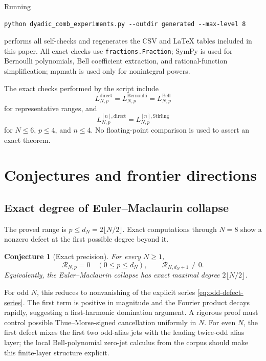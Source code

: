 \documentclass[11pt,oneside]{article}
\numberwithin{equation}{section}
\newtheorem{conjecture}[theorem]{Conjecture}
\theoremstyle{definition}
\theoremstyle{remark}
\newcommand{\defect}{\mathcal R}
\begin{document}
\begin{statusbox}[Reproducibility]
Running
\begin{lstlisting}[style=python]
python dyadic_comb_experiments.py --outdir generated --max-level 8
\end{lstlisting}
performs all self-checks and regenerates the CSV and LaTeX tables included in this paper.
All exact checks use \texttt{fractions.Fraction}; SymPy is used for Bernoulli polynomials,
Bell coefficient extraction, and rational-function simplification; mpmath is used only
for nonintegral powers.
\end{statusbox}

The exact checks performed by the script include
\begin{equation}
 L_{N,p}^{\mathrm{direct}}
 =L_{N,p}^{\mathrm{Bernoulli}}
 =L_{N,p}^{\mathrm{Bell}}
 \label{eq:three-way-check}
\end{equation}
for representative ranges, and
\begin{equation}
 L_{N,p}^{[n],\mathrm{direct}}
 =L_{N,p}^{[n],\mathrm{Stirling}}
 \label{eq:iterated-check}
\end{equation}
for \(N\le6\), \(p\le4\), and \(n\le4\).  No floating-point comparison is used to
assert an exact theorem.

\section{Conjectures and frontier directions}
\label{sec:frontiers}

\subsection{Exact degree of Euler--Maclaurin collapse}

The proved range is \(p\le d_N=2\lfloor N/2\rfloor\).  Exact computations through
\(N=8\) show a nonzero defect at the first possible degree beyond it.

\begin{conjecture}[Exact precision]\label{conj:exact-degree}
For every \(N\ge1\),
\begin{equation}
 \defect_{N,p}=0\quad(0\le p\le d_N),
 \qquad
 \defect_{N,d_N+1}\ne0.
 \label{eq:exact-degree-conj}
\end{equation}
Equivalently, the Euler--Maclaurin collapse has exact maximal degree
\(2\lfloor N/2\rfloor\).
\end{conjecture}

For odd \(N\), this reduces to nonvanishing of the explicit series
\eqref{eq:odd-defect-series}.  The first term is positive in magnitude and the Fourier
product decays rapidly, suggesting a first-harmonic domination argument.  A rigorous proof
must control possible Thue--Morse-signed cancellation uniformly in \(N\).  For even
\(N\), the first defect mixes the first two odd-alias jets with the leading twice-odd
alias layer; the local Bell-polynomial zero-jet calculus from the corpus should make this
finite-layer structure explicit.
\end{document}
